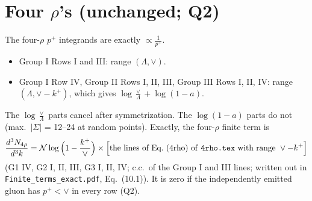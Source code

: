 \documentclass[10pt]{article}
\numberwithin{equation}{section}
\newcommand{\NN}{\mathcal N}
\begin{document}
\section{Four \texorpdfstring{$\rho$}{rho}'s (unchanged; Q2)}\label{sec:four}
The four-$\rho$ $p^+$ integrands are exactly $\propto\frac1{p^+}$.
\begin{itemize}
\item Group I Rows I and III: range $(\Lambda,\vee)$.
\item Group I Row IV, Group II Rows I, II, III, Group III Rows I, II, IV: range $(\Lambda,\vee-k^+)$, which gives $\log\frac\vee\Lambda+\log(1-a)$.
\end{itemize}
The $\log\frac\vee\Lambda$ parts cancel after symmetrization. The $\log(1-a)$ parts do not (max.\ $|\Sigma|$ = 12--24 at random points). Exactly, the four-$\rho$ finite term is
\begin{equation}
\frac{d^3N_{4\rho}}{d^3k}=\NN\log\Big(1-\frac{k^+}{\vee}\Big)\times\Big[\text{the lines of Eq.~(4rho) of \texttt{4rho.tex} with range }\vee-k^+\Big]
\label{eq:four}
\end{equation}
(G1 IV, G2 I, II, III, G3 I, II, IV; c.c.\ of the Group I and III lines; written out in \texttt{Finite\_terms\_exact.pdf}, Eq.~(10.1)). It is zero if the independently emitted gluon has $p^+<\vee$ in every row (Q2).

\end{document}
